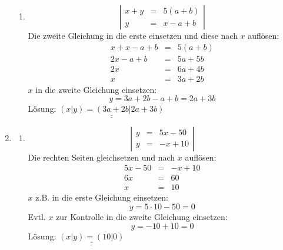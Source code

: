 \documentclass[%
11pt,%
twoside,%
titlepage,%
german,%
]{scrartcl}
\newcommand{\result}[1]{\underline{\underline{#1}}}
\begin{document}
\begin{enumerate}
\begin{enumerate}
  \item 
    \begin{displaymath}
      \left| 
        \begin{array}{rcl}
          x+y & = & 5(a+b) \\
          y & = & x-a+b
        \end{array} \right|
    \end{displaymath}
    Die zweite Gleichung in die erste einsetzen und diese nach $x$ aufl\"osen:
    \begin{eqnarray*}
      x + x-a+b & = & 5(a+b) \\
      2x -a+b & = & 5a+5b \\
      2x & = & 6a+4b \\
      x & = & 3a+2b
    \end{eqnarray*}
    $x$ in die zweite Gleichung einsetzen:
    \begin{displaymath}
      y = 3a+2b-a+b = 2a+3b
    \end{displaymath}
    L\"osung: $\result{(x|y)=(3a+2b|2a+3b)}$
  \end{enumerate}

\item 
  \begin{enumerate}
  \item 
    \begin{displaymath}
      \left| 
        \begin{array}{rcl}
          y & = & 5x-50 \\
          y & = & -x+10
        \end{array} \right|
    \end{displaymath}
    Die rechten Seiten gleichsetzen und nach $x$ aufl\"osen:
    \begin{eqnarray*}
      5x-50 & = & -x+10 \\
      6x & = & 60 \\
      x & = & 10
    \end{eqnarray*}
    $x$ z.B. in die erste Gleichung einsetzen:
    \begin{displaymath}
      y = 5 \cdot 10 - 50 = 0
    \end{displaymath}
    Evtl. $x$ zur Kontrolle in die zweite Gleichung einsetzen:
    \begin{displaymath}
      y = -10 + 10 = 0
    \end{displaymath}
    L\"osung: $\result{(x|y)=(10|0)}$


\end{enumerate}
\end{enumerate}
\end{document}

